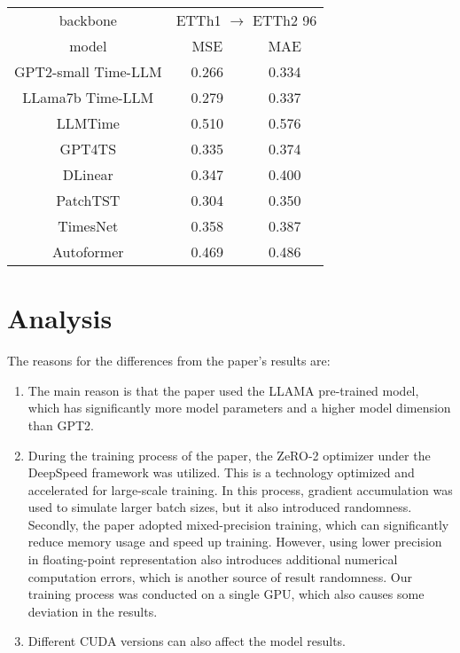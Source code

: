 \documentclass[conference]{IEEEtran}
\begin{document}
\begin{tabular}{|c|c|c|}
    \hline
    backbone            & \multicolumn{2}{c|}{ETTh1 $\rightarrow$ ETTh2 96}         \\
    \cline{2-3}
    model               & MSE                                               & MAE   \\
    \hline
    GPT2-small Time-LLM & 0.266                                             & 0.334 \\
    \hline
    LLama7b Time-LLM    & 0.279                                             & 0.337 \\
    LLMTime             & 0.510                                             & 0.576 \\
    GPT4TS              & 0.335                                             & 0.374 \\
    DLinear             & 0.347                                             & 0.400 \\
    PatchTST            & 0.304                                             & 0.350 \\
    TimesNet            & 0.358                                             & 0.387 \\
    Autoformer          & 0.469                                             & 0.486 \\
    \hline
\end{tabular}



\section{Analysis}

The reasons for the differences from the paper's results are:

\begin{enumerate}
    \item The main reason is that the paper used the LLAMA pre-trained model, which has significantly more model parameters and a higher model dimension than GPT2.

    \item During the training process of the paper, the ZeRO-2 optimizer under the DeepSpeed framework was utilized. This is a technology optimized and accelerated for large-scale training. In this process, gradient accumulation was used to simulate larger batch sizes, but it also introduced randomness. Secondly, the paper adopted mixed-precision training, which can significantly reduce memory usage and speed up training. However, using lower precision in floating-point representation also introduces additional numerical computation errors, which is another source of result randomness. Our training process was conducted on a single GPU, which also causes some deviation in the results.

    \item Different CUDA versions can also affect the model results.
\end{enumerate}
\end{document}
